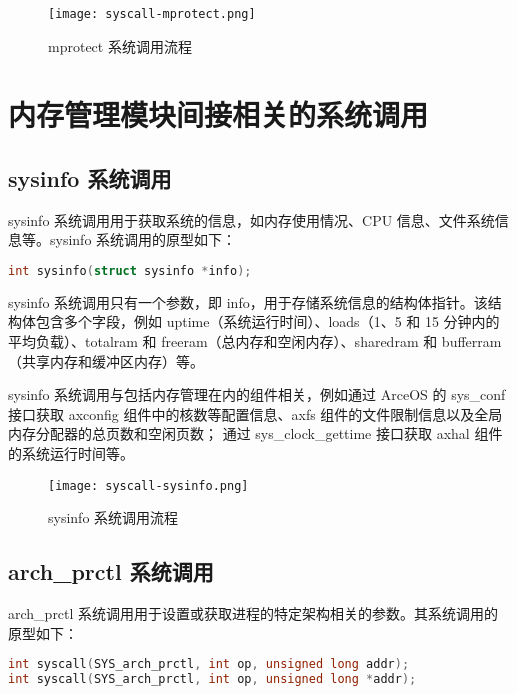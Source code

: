 \begin{figure}[H]
    \centering
    \texttt{[image: syscall-mprotect.png]}
    \caption{mprotect 系统调用流程}
    \label{fig:mprotect}
\end{figure}

\section{内存管理模块间接相关的系统调用}

\subsection{sysinfo 系统调用}

sysinfo 系统调用用于获取系统的信息，如内存使用情况、CPU 信息、文件系统信息等。sysinfo 系统调用的原型如下：
\begin{lstlisting}[language=c, caption=sysinfo]
int sysinfo(struct sysinfo *info);
\end{lstlisting}
sysinfo 系统调用只有一个参数，即 info，用于存储系统信息的结构体指针。该结构体包含多个字段，例如 uptime（系统运行时间）、loads（1、5 和 15 分钟内的平均负载）、totalram 和 freeram（总内存和空闲内存）、sharedram 和 bufferram（共享内存和缓冲区内存）等。


sysinfo 系统调用与包括内存管理在内的组件相关，例如通过 ArceOS 的 sys\_conf 接口获取 axconfig 组件中的核数等配置信息、axfs 组件的文件限制信息以及全局内存分配器的总页数和空闲页数；
通过 sys\_clock\_gettime 接口获取 axhal 组件的系统运行时间等。

\begin{figure}[H]
    \centering
    \texttt{[image: syscall-sysinfo.png]}
    \caption{sysinfo 系统调用流程}
    \label{fig:sysinfo-call}
\end{figure}

\subsection{arch\_prctl 系统调用}

arch\_prctl 系统调用用于设置或获取进程的特定架构相关的参数。其系统调用的原型如下：
\begin{lstlisting}[language=c, caption=arch\_prctl]
int syscall(SYS_arch_prctl, int op, unsigned long addr);
int syscall(SYS_arch_prctl, int op, unsigned long *addr);
\end{lstlisting}


